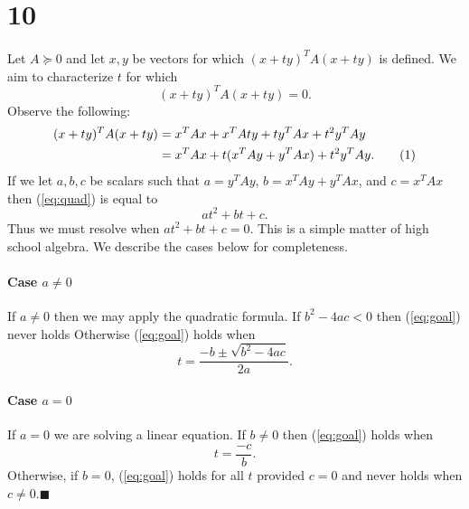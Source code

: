 \documentclass[letterpaper,12pt,oneside,onecolumn]{article}
\newcommand\numberthis{\addtocounter{equation}{1}\tag{\theequation}}
\begin{document}
\section*{10}
\paragraph{}
Let $A \succcurlyeq 0$ and let $x,y$ be vectors for which $(x+ty)^TA(x+ty)$ is defined. We aim to characterize $t$ for which
\begin{equation}(x+ty)^TA(x+ty) = 0\label{eq:goal}.\end{equation} Observe the following:
\begin{align*}
(x+ty)^TA(x+ty) &= x^TAx + x^TAty + ty^TAx + t^2y^TAy \\
&= x^TAx + t(x^TAy + y^TAx) + t^2y^TAy. \numberthis \label{eq:quad}
\end{align*}
If we let $a,b,c$ be scalars such that $a = y^TAy$, $b=x^TAy + y^TAx$, and $c = x^TAx$ then (\ref{eq:quad}) is equal to
$$at^2 + bt + c.$$
Thus we must resolve when $at^2 + bt +c =0$. This is a simple matter of high school algebra. We describe the cases below for completeness.
\paragraph{Case $a \neq 0$}
If $a \neq 0$ then we may apply the quadratic formula. If $b^2-4ac <0$ then (\ref{eq:goal}) never holds Otherwise (\ref{eq:goal}) holds when
$$t = \frac{-b \pm \sqrt{b^2-4ac}}{2a}.$$
\paragraph{Case $a = 0$}
If $a = 0$ we are solving a linear equation. If $b \neq 0$ then (\ref{eq:goal}) holds when $$t = \frac{-c}{b}.$$ Otherwise, if $b = 0$, (\ref{eq:goal}) holds for all $t$ provided $c=0$ and never holds when $c\neq 0$.$\blacksquare$
\end{document}
